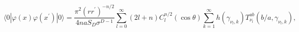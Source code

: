 \begin{equation}
\langle 0|\varphi (x)\varphi (x^{\prime })|0\rangle =\frac{\pi
^{2}(rr^{\prime })^{-n/2}}{4naS_{D}\sigma
^{D-1}}\sum_{l=0}^{\infty }(2l+n)C_{l}^{n/2}(\cos \theta
)\sum_{k=1}^{\infty }h(\gamma _{\nu _{l} ,k})T_{\nu _{l}
}^{ab}(b/a,\gamma _{\nu _{l} ,k}),  \label{fieldmodesum1ab}
\end{equation}


